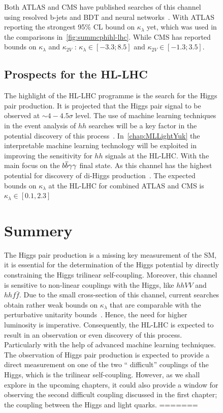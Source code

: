 \begin{figure}[!htpb]
\begin{table}[h!]
{	}
	\label{tab:xsec14}
\end{table}
Both ATLAS and CMS have published searches of this channel using resolved b-jets and BDT and neural networks~\cite{ATLAS:2021jki,CMS:2020tkr}. With ATLAS reporting the strongest 95\% CL bound on $\kappa_\lambda$ yet, which was used in the comparisons in~\autoref{fig:summcphihl-lhc}. While CMS has reported bounds on $\kappa_\lambda$ and $\kappa_{2V}$ : $\kappa_{\lambda} \in [-3.3;8.5]$ and $\kappa_{2V} \in [-1.3; 3.5]$.                                                                                       
\subsection{Prospects for the HL-LHC}
The highlight of the HL-LHC programme is the search for the Higgs pair production. It is projected that the Higgs pair signal to be observed at $\sim  4- 4.5\sigma $ level. The use of machine learning techniques in the event analysis of $hh$ searches will be a key factor in the potential discovery of this process~\cite{Cepeda:2019klc}. In~\autoref{chap:MLLightYuk} the interpretable machine learning technology will be exploited in improving the sensitivity for $hh$ signals at the HL-LHC. With the main focus on the $b\overline b\gamma\gamma$ final state. As this channel has the highest potential for discovery of di-Higgs production~\cite{Azatov:2015oxa, Baur:2003gp, Baglio:2012np, Kling:2016lay, Barger:2013jfa, Adhikary:2017jtu,Alves:2017ued}. The expected bounds on $\kappa_\lambda$ at the HL-LHC for combined ATLAS and CMS is~$\kappa_{\lambda} \in [0.1,2.3]$~\cite{DiMicco:2019ngk,Cepeda:2019klc}
 
\section{Summery \label{summtrilinear}  }
The Higgs pair production is a missing key measurement of the SM, it is essential for the determination of the Higgs potential by directly constraining the Higgs trilinear self-coupling. Moreover, this channel is sensitive to non-linear couplings with the Higgs, like $hhVV$ and $hh f\bar f$. Due to the small cross-section of this channel, current searches obtain rather weak bounds on $\kappa_{\lambda}$ that are comparable with the perturbative unitarity bounds~\cite{DiLuzio:2017tfn}. Hence, the need for higher luminosity is imperative. Consequently, the HL-LHC is expected to result in an observation or even discovery of this process. Particularly with the help of advanced machine learning techniques.\\ The observation of Higgs pair production is expected to provide a direct measurement on one of the two `` difficult'' couplings of the Higgs, which is the trilinear self-coupling. However, as we shall explore in the upcoming chapters, it could also provide a window for observing the second difficult coupling discussed in the first chapter; the coupling between the Higgs and light quarks. 
=======


\end{figure}
